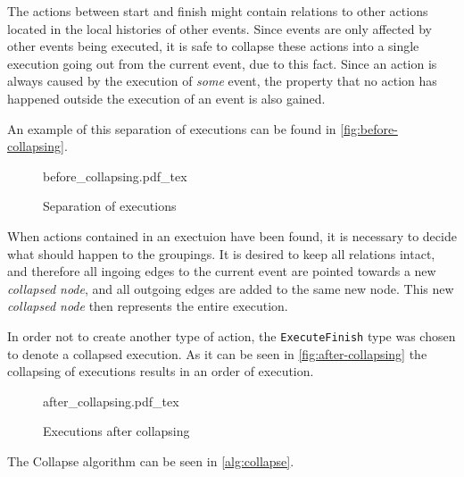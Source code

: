 	The actions between start and finish might contain relations to other actions located in the local histories of other events. Since events are only affected by other events being executed, it is safe to collapse these actions into a single execution going out from the current event, due to this fact. Since an action is always caused by the execution of \textit{some} event, the property that no action has happened outside the execution of an event is also gained. 
	
	An example of this separation of executions can be found in \autoref{fig:before-collapsing}.
	
	\begin{figure}
		\centering
		\def\svgwidth{0.42\columnwidth}
		\fontsize{6}{8}\selectfont
		{before_collapsing.pdf_tex}
		\caption{Separation of executions}
		\label{fig:before-collapsing}
	\end{figure}
	
	\newpar When actions contained in an exectuion have been found, it is necessary to decide what should happen to the groupings. It is desired to keep all relations intact, and therefore all ingoing edges to the current event are pointed towards a new \textit{collapsed node}, and all outgoing edges are added to the same new node. This new \textit{collapsed node} then represents the entire execution. 
	
	In order not to create another type of action, the \texttt{ExecuteFinish} type was chosen to denote a collapsed execution. As it can be seen in \autoref{fig:after-collapsing} the collapsing of executions results in an order of execution.
	
	\begin{figure}
		\centering
		\def\svgwidth{0.22\columnwidth}
		\fontsize{6}{8}\selectfont
		{after_collapsing.pdf_tex}
		\caption{Executions after collapsing}
		\label{fig:after-collapsing}
	\end{figure}
	
	The Collapse algorithm can be seen in \autoref{alg:collapse}.
	
